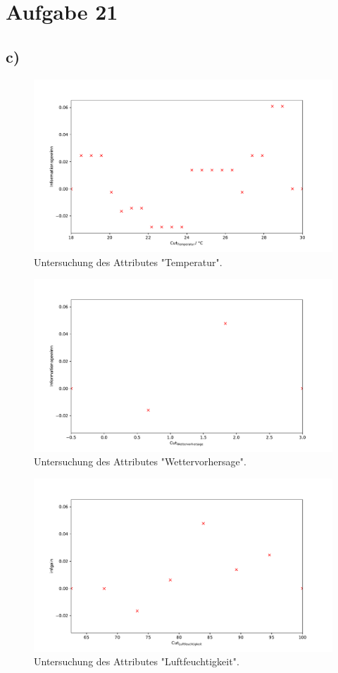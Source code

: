 \documentclass[a4paper, 11pt]{article}
\begin{document}


\section*{Aufgabe 21}
\subsection*{c)}
\begin{figure}
    \centering
    \includegraphics[width=\textwidth]{../A21/Temperatur.pdf}
    \caption{Untersuchung des Attributes "Temperatur".}
\end{figure}
\begin{figure}
    \centering
    \includegraphics[width=\textwidth]{../A21/Wettervorhersage.pdf}
    \caption{Untersuchung des Attributes "Wettervorhersage".}
\end{figure}
\begin{figure}
    \centering
    \includegraphics[width=\textwidth]{../A21/Luftfeuchtigkeit.pdf}
    \caption{Untersuchung des Attributes "Luftfeuchtigkeit".}
\end{figure}
\end{document}
